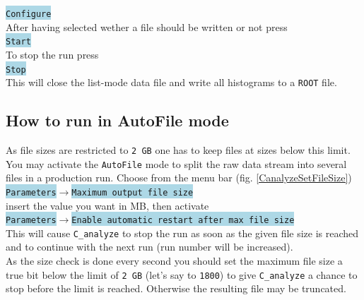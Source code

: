 \documentclass[10pt]{article}
\newcommand{\blue}[1]{\colorbox{lightblue}{\texttt{#1}}}
\begin{document}
\hspace*{.2\linewidth}\blue{Configure}\\

After having selected wether a file should be written or not press\\

\hspace*{.2\linewidth}\blue{Start}\\

To stop the run press\\

\hspace*{.2\linewidth}\blue{Stop}\\

This will close the list-mode data file and write all histograms to a \texttt{ROOT} file.

\subsection{How to run in AutoFile mode}\vspace{3mm}

As file sizes are restricted to \texttt{2\,GB} one has to keep files at sizes below this limit.\\
You may activate the \texttt{AutoFile} mode to split the raw data stream into several files in a production run.
Choose from the menu bar (fig. \ref{CanalyzeSetFileSize}) \\

\hspace*{.2\linewidth}\blue{Parameters}$\rightarrow$\blue{Maximum output file size}\\

insert the value you want in MB, then activate\\

\hspace*{.2\linewidth}\blue{Parameters}$\rightarrow$\blue{Enable automatic restart after max file size}\\

This will cause \texttt{C\_analyze} to stop the run as soon as the given file size is reached and to
continue with the next run (run number will be increased).\\
As the size check is done every second you should set the maximum file size a true bit below
the limit of \texttt{2\,GB} (let's say to \texttt{1800}) to give \texttt{C\_analyze} a chance to
stop before the limit is reached. Otherwise the resulting file may be truncated.\\
\end{document}
